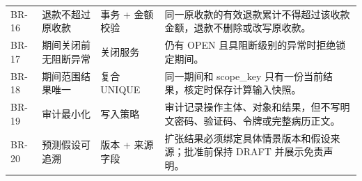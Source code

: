 \begin{longtable}{@{}C{14mm}L{30mm}L{29mm}L{74mm}@{}}
BR-16 & 退款不超过原收款 & 事务 + 金额校验 & 同一原收款的有效退款累计不得超过该收款金额，退款不删除或改写原收款。 \\
BR-17 & 期间关闭前无阻断异常 & 关闭服务 & 仍有 OPEN 且具阻断级别的异常时拒绝锁定期间。 \\
BR-18 & 期间范围结果唯一 & 复合 UNIQUE & 同一期间和 scope\_key 只有一份当前结果，核定时保存计算输入快照。 \\
BR-19 & 审计最小化 & 写入策略 & 审计记录操作主体、对象和结果，但不写明文密码、验证码、令牌或完整病历正文。 \\
BR-20 & 预测假设可追溯 & 版本 + 来源字段 & 扩张结果必须绑定具体情景版本和假设来源；批准前保持 DRAFT 并展示免责声明。 \\
\bottomrule\end{longtable}
\endgroup

